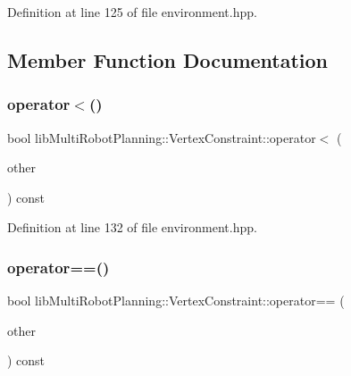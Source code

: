 Definition at line 125 of file environment.\+hpp.



\subsection{Member Function Documentation}
\mbox{\label{structlib_multi_robot_planning_1_1_vertex_constraint_a36c1e9a9154da12f2256a906759eecf7}} 
\subsubsection{\texorpdfstring{operator$<$()}{operator<()}}
{\footnotesize\ttfamily bool lib\+Multi\+Robot\+Planning\+::\+Vertex\+Constraint\+::operator$<$ (\begin{DoxyParamCaption}\item[{const \hyperlink{structlib_multi_robot_planning_1_1_vertex_constraint}{Vertex\+Constraint} \&}]{other }\end{DoxyParamCaption}) const\hspace{0.3cm}{\ttfamily [inline]}}



Definition at line 132 of file environment.\+hpp.

\mbox{\label{structlib_multi_robot_planning_1_1_vertex_constraint_a82b29fb9265cded41e50cf726db90d11}} 
\subsubsection{\texorpdfstring{operator==()}{operator==()}}
{\footnotesize\ttfamily bool lib\+Multi\+Robot\+Planning\+::\+Vertex\+Constraint\+::operator== (\begin{DoxyParamCaption}\item[{const \hyperlink{structlib_multi_robot_planning_1_1_vertex_constraint}{Vertex\+Constraint} \&}]{other }\end{DoxyParamCaption}) const\hspace{0.3cm}{\ttfamily [inline]}}



